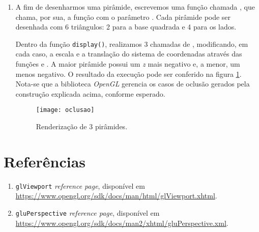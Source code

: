 \documentclass[12pt, a4paper]{article}
\begin{document}
\begin {enumerate}
\begin{figure}[h!]
\caption{Modificação do parâmetro \textit{fovy} da função
\texttt{gluPerspective()}.}
\end{figure}

\FloatBarrier

\item A fim de desenharmos uma pirâmide, escrevemos uma função chamada
, que chama, por sua, a função  com
o parâmetro . Cada pirâmide pode ser desenhada com 6
triângulos: 2 para a base quadrada e 4 para os lados. 

\vspace{12pt}

Dentro da função \texttt{display()}, realizamos 3 chamadas de
, modificando, em cada caso, a escala e a translação do
sistema de coordenadas através das funções  e
. A maior pirâmide possui um \textit{z} mais negativo e, a
menor, um menos negativo. O resultado da execução pode ser conferido na figura
\ref{img:oclusao}. Nota-se que a biblioteca \textit{OpenGL} gerencia os casos de
oclusão gerados pela construção explicada acima, conforme esperado.

\FloatBarrier

\begin{figure}[h!]
\centering
\texttt{[image: oclusao]}
\caption{Renderização de 3 pirâmides.}
\label{img:oclusao}
\end{figure}

\FloatBarrier

\end{enumerate}

\section* {Referências}

\begin {enumerate}
  \item \texttt{glViewport} \textit{reference page}, disponível em
  \url{https://www.opengl.org/sdk/docs/man/html/glViewport.xhtml}.
  \item \texttt{gluPerspective} \textit{reference page}, disponível em
  \url{https://www.opengl.org/sdk/docs/man2/xhtml/gluPerspective.xml}.
\end{enumerate}
\end{document}
